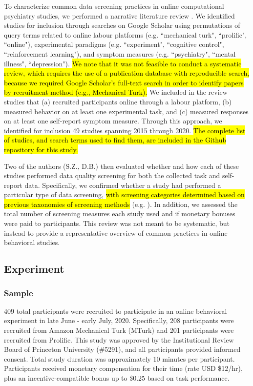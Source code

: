 \documentclass[a4paper,notitlepage,12pt]{article}
\begin{document}
\begin{refsection}[main]
To characterize common data screening practices in online computational psychiatry studies, we performed a narrative literature review \cite{grant2009typology}. We identified studies for inclusion through searches on Google Scholar using permutations of query terms related to online labour platforms (e.g. ``mechanical turk", ``prolific", ``online"), experimental paradigms (e.g. ``experiment", ``cognitive control", ``reinforcement learning"), and symptom measures (e.g. ``psychiatry", ``mental illness", ``depression"). \hl{We note that it was not feasible to conduct a systematic review, which requires the use of a publication database with reproducible search, because we required Google Scholar's full-text search in order to identify papers by recruitment method (e.g., Mechanical Turk).} We included in the review studies that (a) recruited participants online through a labour platform, (b) measured behavior on at least one experimental task, and (c) measured responses on at least one self-report symptom measure. Through this approach, we identified for inclusion 49 studies spanning 2015 through 2020. \hl{The complete list of studies, and search terms used to find them, are included in the Github repository for this study.}

Two of the authors (S.Z., D.B.) then evaluated whether and how each of these studies performed data quality screening for both the collected task and self-report data. Specifically, we confirmed whether a study had performed a particular type of data screening, \hl{with screening categories determined based on previous taxonomies of screening methods} (e.g. \cite{curran2016methods}). In addition, we assessed the total number of screening measures each study used and if monetary bonuses were paid to participants. This review was not meant to be systematic, but instead to provide a representative overview of common practices in online behavioral studies.

\subsection{Experiment}

\subsubsection{Sample}

409 total participants were recruited to participate in an online behavioral experiment in late June - early July, 2020. Specifically, 208 participants were recruited from Amazon Mechanical Turk (MTurk) and 201 participants were recruited from Prolific. This study was approved by the Institutional Review Board of Princeton University (\#5291), and all participants provided informed consent. Total study duration was approximately 10 minutes per participant. Participants received monetary compensation for their time (rate USD \$12/hr), plus an incentive-compatible bonus up to \$0.25 based on task performance. 


\end{refsection}
\end{document}
